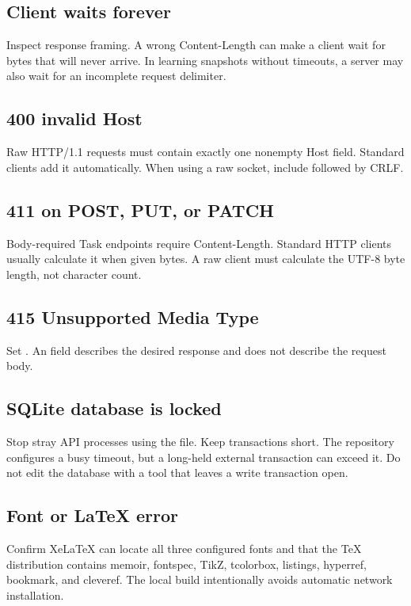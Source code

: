 \subsection{Client waits forever}

Inspect response framing. A wrong Content-Length can make a client wait for bytes
that will never arrive. In learning snapshots without timeouts, a server may also
wait for an incomplete request delimiter.

\subsection{400 invalid Host}

Raw HTTP/1.1 requests must contain exactly one nonempty Host field. Standard
clients add it automatically. When using a raw socket, include
 followed by CRLF.

\subsection{411 on POST, PUT, or PATCH}

Body-required Task endpoints require Content-Length. Standard HTTP clients
usually calculate it when given bytes. A raw client must calculate the UTF-8 byte
length, not character count.

\subsection{415 Unsupported Media Type}

Set . An  field describes the
desired response and does not describe the request body.

\subsection{SQLite database is locked}

Stop stray API processes using the file. Keep transactions short. The repository
configures a busy timeout, but a long-held external transaction can exceed it.
Do not edit the database with a tool that leaves a write transaction open.

\subsection{Font or LaTeX error}

Confirm XeLaTeX can locate all three configured fonts and that the TeX distribution
contains memoir, fontspec, TikZ, tcolorbox, listings, hyperref, bookmark, and
cleveref. The local build intentionally avoids automatic network installation.

